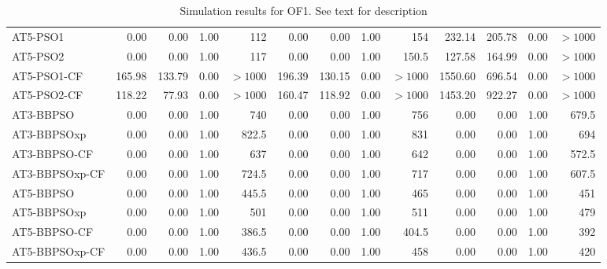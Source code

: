 \documentclass[cmbright]{staauth}
\begin{document}
\begin{table}[ht]
\begin{tabular}{l|rrrr|rrrr|rrrr}
   \hline
AT5-PSO1 & 0.00 & 0.00 & 1.00 & 112 & 0.00 & 0.00 & 1.00 & 154 & 232.14 & 205.78 & 0.00 & $> 1000$ \\
  AT5-PSO2 & 0.00 & 0.00 & 1.00 & 117 & 0.00 & 0.00 & 1.00 & 150.5 & 127.58 & 164.99 & 0.00 & $> 1000$ \\
  AT5-PSO1-CF & 165.98 & 133.79 & 0.00 & $> 1000$ & 196.39 & 130.15 & 0.00 & $> 1000$ & 1550.60 & 696.54 & 0.00 & $> 1000$ \\
  AT5-PSO2-CF & 118.22 & 77.93 & 0.00 & $> 1000$ & 160.47 & 118.92 & 0.00 & $> 1000$ & 1453.20 & 922.27 & 0.00 & $> 1000$ \\
   \hline
AT3-BBPSO & 0.00 & 0.00 & 1.00 & 740 & 0.00 & 0.00 & 1.00 & 756 & 0.00 & 0.00 & 1.00 & 679.5 \\
  AT3-BBPSOxp & 0.00 & 0.00 & 1.00 & 822.5 & 0.00 & 0.00 & 1.00 & 831 & 0.00 & 0.00 & 1.00 & 694 \\
  AT3-BBPSO-CF & 0.00 & 0.00 & 1.00 & 637 & 0.00 & 0.00 & 1.00 & 642 & 0.00 & 0.00 & 1.00 & 572.5 \\
  AT3-BBPSOxp-CF & 0.00 & 0.00 & 1.00 & 724.5 & 0.00 & 0.00 & 1.00 & 717 & 0.00 & 0.00 & 1.00 & 607.5 \\
   \hline
AT5-BBPSO & 0.00 & 0.00 & 1.00 & 445.5 & 0.00 & 0.00 & 1.00 & 465 & 0.00 & 0.00 & 1.00 & 451 \\
  AT5-BBPSOxp & 0.00 & 0.00 & 1.00 & 501 & 0.00 & 0.00 & 1.00 & 511 & 0.00 & 0.00 & 1.00 & 479 \\
  AT5-BBPSO-CF & 0.00 & 0.00 & 1.00 & 386.5 & 0.00 & 0.00 & 1.00 & 404.5 & 0.00 & 0.00 & 1.00 & 392 \\
  AT5-BBPSOxp-CF & 0.00 & 0.00 & 1.00 & 436.5 & 0.00 & 0.00 & 1.00 & 458 & 0.00 & 0.00 & 1.00 & 420 \\
   \hline
\end{tabular}
\endgroup
\caption{Simulation results for OF1. See text for description}
\label{tab:psosim1}
\end{table}
\end{document}
